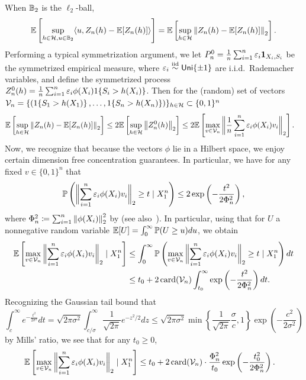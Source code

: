 \documentclass[11pt]{article}
\newcommand{\scorerv}{S}
\begin{document}
When $\mathbb{B}_2$ is the $\ell_2$-ball,
\begin{equation*}
  \mathbb{E}\left[\sup_{h \in \mathcal{H}, u \in \mathbb{B}_2}
    \langle u, Z_n(h) - \mathbb{E}[Z_n(h)]\rangle\right]
  = \mathbb{E}\left[\sup_{h \in \mathcal{H}} \left\|{Z_n(h) - \mathbb{E}[Z_n(h)]}\right\|_2
    \right].
\end{equation*}
Performing a typical symmetrization argument, we let $P_n^0 = \frac{1}{n}
\sum_{i = 1}^n \varepsilon_i \pointmass_{X_i, \scorerv_i}$ be the
symmetrized empirical measure, where $\varepsilon_i \stackrel{\rm iid}{\sim} \mathsf{Uni}\{\pm
1\}$ are i.i.d.\ Rademacher variables, and define the symmetrized process
$Z_n^0(h) = \frac{1}{n} \sum_{i = 1}^n \varepsilon_i \phi(X_i)
\indic{\scorerv_i > h(X_i)}$.
%
Then for the (random) set of vectors
$\mc{V}_n = \{(\indic{\scorerv_1 > h(X_1)}, \ldots, \indic{\scorerv_n >
  h(X_n)})\}_{h \in \mc{H}} \subset \{0, 1\}^n$
\begin{align*}
  \mathbb{E}\left[\sup_{h \in \mathcal{H}} \left\|{Z_n(h) - \mathbb{E}[Z_n(h)]}\right\|_2 \right]
  & \le 2 \mathbb{E}\left[\sup_{h \in \mathcal{H}} \left\|{Z_n^0(h)}\right\|_2\right]
  \le 2 \mathbb{E}\left[\max_{v \in \mathcal{V}_n}
    \bigg\|{\frac{1}{n} \sum_{i = 1}^n \varepsilon_i \phi(X_i) v_i}\bigg\|_2\right].
\end{align*}
Now, we recognize that because the vectors $\phi$ lie in a Hilbert
space,
we enjoy certain dimension free concentration guarantees.
%
In particular, we have for any fixed $v \in \{0, 1\}^n$ that
\begin{equation*}
  \mathbb{P}\left(\bigg\|{\sum_{i = 1}^n \varepsilon_i \phi(X_i) v_i}\bigg\|_2 \ge t
  \mid X_1^n \right)
  \le 2 \exp\left(-\frac{t^2}{2 \Phi_n^2}\right),
\end{equation*}
where $\Phi_n^2 \coloneqq \sum_{i = 1}^n \left\|{\phi(X_i)}\right\|_2^2$ by
\citet[Theorem 3.5]{Pinelis94} (see also~\cite[Corollary
  10]{HowardRaMcSe20}).
%
In particular, using that for $U$ a nonnegative random variable
$\mathbb{E}[U] = \int_0^\infty \mathbb{P}(U \ge u) du$,
we obtain
\begin{align*}
  \mathbb{E}\left[\max_{v \in \mathcal{V}_n} \bigg\|{\sum_{i = 1}^n
      \varepsilon_i \phi(X_i) v_i}\bigg\|_2
    \mid X_1^n \right]
  & \le \int_0^\infty \mathbb{P}
  \left(\max_{v \in \mathcal{V}_n}
  \bigg\|{\sum_{i = 1}^n
    \varepsilon_i \phi(X_i) v_i}\bigg\|_2 \ge t \mid X_1^n \right) dt \\
  & \le t_0
  + 2 \mathop{\rm card}(\mathcal{V}_n) \int_{t_0}^\infty
  \exp\left(-\frac{t^2}{2 \Phi_n^2}\right) dt.
\end{align*}
Recognizing the Gaussian tail bound
that
\begin{equation*}
  \int_c^\infty e^{-\frac{t^2}{2 \sigma^2}} dt
  = \sqrt{2 \pi \sigma^2}
  \int_{c/\sigma}^\infty \frac{1}{\sqrt{2\pi}} e^{-z^2 / 2} dz
  \le \sqrt{2 \pi \sigma^2}
  \min\left\{\frac{1}{\sqrt{2\pi}}
  \frac{\sigma}{c}, 1 \right\}
  \exp\left(-\frac{c^2}{2\sigma^2}\right)
\end{equation*}
by Mills' ratio, we see that for any $t_0 \ge 0$,
\begin{align*}
  \mathbb{E}\left[\max_{v \in \mathcal{V}_n} \bigg\|{\sum_{i = 1}^n
      \varepsilon_i \phi(X_i) v_i}\bigg\|_2
    \mid X_1^n \right]
  & \le t_0 + 2 \mathop{\rm card}(\mathcal{V}_n)
  \cdot \frac{\Phi_n^2}{t_0}
  \exp\left(-\frac{t_0^2}{2 \Phi_n^2}\right).
\end{align*}
\end{document}
